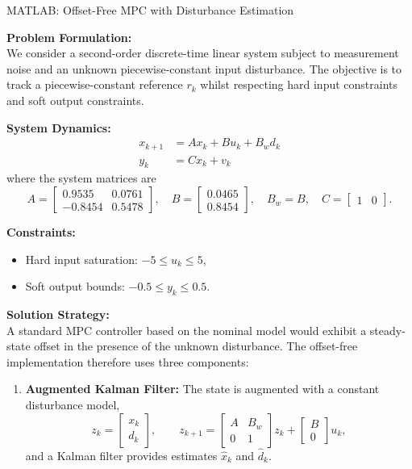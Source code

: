 \begin{examplebox}{MATLAB: Offset-Free MPC with Disturbance Estimation}
	
	\textbf{Problem Formulation:}\\
	
	We consider a second-order discrete-time linear system subject to measurement noise and an unknown piecewise-constant input disturbance. The objective is to track a piecewise-constant reference \(r_k\) whilst respecting hard input constraints and soft output constraints.
	
	\textbf{System Dynamics:}\\
	
	\begin{align*}
		x_{k+1} &= A x_k + B u_k + B_w d_k \\
		y_k &= C x_k + v_k
	\end{align*}
	where the system matrices are
	\[
	A = \begin{bmatrix} 0.9535 & 0.0761 \\ -0.8454 & 0.5478 \end{bmatrix}, \quad
	B = \begin{bmatrix} 0.0465 \\ 0.8454 \end{bmatrix}, \quad
	B_w = B, \quad
	C = \begin{bmatrix} 1 & 0 \end{bmatrix}.
	\]
	
	\textbf{Constraints:}
	\begin{itemize}
		\item Hard input saturation: \(-5 \le u_k \le 5\),
		\item Soft output bounds: \(-0.5 \le y_k \le 0.5\).
	\end{itemize}
	
	\textbf{Solution Strategy:}\\
	
	A standard MPC controller based on the nominal model would exhibit a steady-state offset in the presence of the unknown disturbance. The offset-free implementation therefore uses three components:
	
	\begin{enumerate}
		\item \textbf{Augmented Kalman Filter:} The state is augmented with a constant disturbance model,
		\[
		z_k =
		\begin{bmatrix}
			x_k\\
			d_k
		\end{bmatrix}, \qquad
		z_{k+1} =
		\begin{bmatrix}
			A & B_w\\
			0 & 1
		\end{bmatrix} z_k +
		\begin{bmatrix}
			B\\
			0
		\end{bmatrix} u_k,
		\]
		and a Kalman filter provides estimates \(\hat x_k\) and \(\hat d_k\).
		

\end{enumerate}
\end{examplebox}
